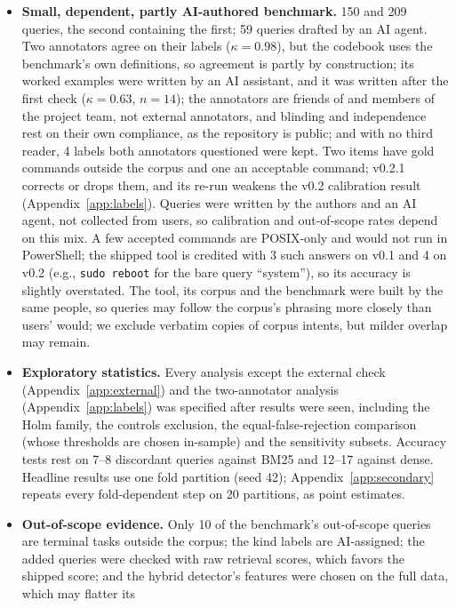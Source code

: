 \begin{itemize}
  \item \textbf{Small, dependent, partly AI-authored benchmark.} 150 and 209 queries, the second containing the first;
  59 queries drafted by an AI agent. Two annotators agree on their labels ($\kappa=0.98$), but the codebook uses the
  benchmark's own definitions, so agreement is partly by construction; its worked examples were written by an AI
  assistant, and it was written after the first check ($\kappa=0.63$, $n=14$); the annotators are friends of
  \authorrel{} and members of the project team, not external annotators, and blinding and independence rest on their own
  compliance, as the repository is public; and with no third reader, 4 labels both annotators
  questioned were kept. Two items have gold commands outside the corpus and one an acceptable command; v0.2.1
  corrects or drops them, and its re-run weakens the v0.2 calibration result (Appendix~\ref{app:labels}). Queries were written by the authors and an AI agent,
  not collected from users, so calibration and out-of-scope rates depend on this mix. A few accepted commands are
  POSIX-only and would not run in PowerShell; the shipped tool is credited with 3 such answers on v0.1 and 4 on v0.2
  (e.g., \texttt{sudo reboot} for the bare query ``system''), so its accuracy is slightly overstated. The tool, its
  corpus and the benchmark were built by the same people, so queries may follow the corpus's phrasing more closely
  than users' would; we exclude verbatim copies of corpus intents, but milder overlap may remain.
  \item \textbf{Exploratory statistics.} Every analysis except the external check (Appendix~\ref{app:external}) and the two-annotator analysis
  (Appendix~\ref{app:labels}) was specified after results were seen, including the Holm
  family, the controls exclusion, the equal-false-rejection comparison (whose thresholds are chosen in-sample) and
  the sensitivity subsets. Accuracy tests rest on 7--8 discordant queries against BM25 and 12--17 against dense. Headline results use one fold partition
  (seed 42); Appendix~\ref{app:secondary} repeats every fold-dependent step on 20 partitions, as point estimates.
  \item \textbf{Out-of-scope evidence.} Only 10 of the benchmark's out-of-scope queries are terminal tasks outside
  the corpus; the kind labels are AI-assigned; the added queries were checked with raw retrieval scores, which favors
  the shipped score; and the hybrid detector's features were chosen on the full data, which may flatter its

\end{itemize}
